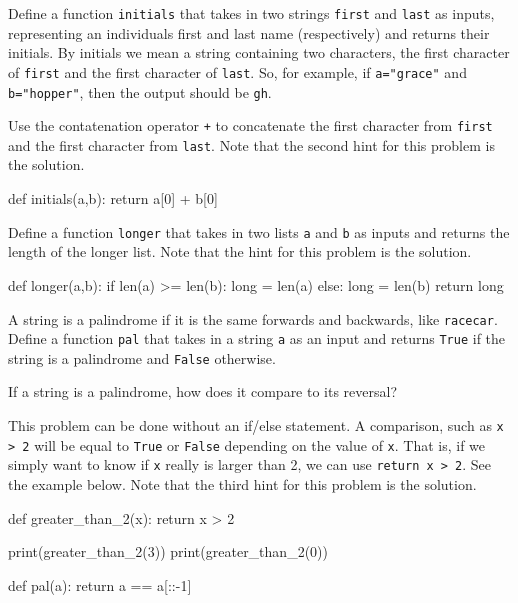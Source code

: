 \documentclass{ximera}
\begin{document}
\begin{question}
	Define a function \verb|initials| that takes in two strings \verb|first| and \verb|last| as inputs, representing an individuals first and last name (respectively) and returns their initials. By initials we mean a string containing two characters, the first character of \verb|first| and the first character of \verb|last|. So, for example, if \verb|a="grace"| and \verb|b="hopper"|, then the output should be \verb|gh|.
	\begin{hint}
	Use the contatenation operator \verb|+| to concatenate the first character from \verb|first| and the first character from \verb|last|. Note that the second hint for this problem is the solution.
	\end{hint}
	\begin{hint}
\begin{sageCell}
def initials(a,b):
	return a[0] + b[0]
\end{sageCell}
	\end{hint}
\end{question}

\begin{question}
Define a function \verb|longer| that takes in two lists \verb|a| and \verb|b| as inputs and returns the length of the longer list. Note that the hint for this problem is the solution.
	\begin{hint}
\begin{sageCell}
def longer(a,b):
        if len(a) >= len(b):
                long = len(a)
        else:
                long = len(b)
        return long
\end{sageCell}
	\end{hint}
\end{question}

\begin{question}
A string is a palindrome if it is the same forwards and backwards, like \verb|racecar|. Define a function \verb|pal| that takes in a string \verb|a| as an input and returns \verb|True| if the string is a palindrome and \verb|False| otherwise.
	\begin{hint}
	If a string is a palindrome, how does it compare to its reversal? 
	\end{hint}
	\begin{hint}
	This problem can be done without an if/else statement. A comparison, such as \verb|x > 2| will be equal to \verb|True| or \verb|False| depending on the value of \verb|x|. That is, if we simply want to know if \verb|x| really is larger than 2, we can use \verb|return x > 2|. See the example below. Note that the third hint for this problem is the solution.
\begin{sageCell}
def greater_than_2(x):
        return x > 2

print(greater_than_2(3))
print(greater_than_2(0))
\end{sageCell}
	\end{hint}
	\begin{hint}
\begin{sageCell}
def pal(a):
        return a == a[::-1]
\end{sageCell}
	\end{hint}
\end{question}
\end{document}
